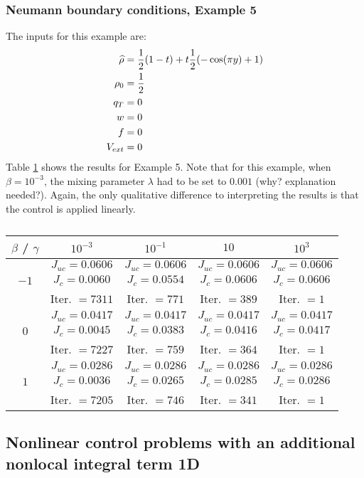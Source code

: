 \subsubsection{Neumann boundary conditions, Example 5}
The inputs for this example are:
\begin{align*}
\widehat \rho &= \frac{1}{2}(1-t) + t\frac{1}{2}(-\cos(\pi y) + 1)\\
\rho_{0} &= \frac{1}{2}\\
q_{T} &= 0\\
{w} &= 0\\
f &=0\\
V_{ext} &=0
\end{align*}
Table \ref{TabNFlowEx5} shows the results for Example 5. Note that for this example, when $\beta = 10^{-3}$, the mixing parameter $\lambda$ had to be set to $0.001$ (why? explanation needed?).
Again, the only qualitative difference to interpreting the results is that the control is applied linearly.
\begin{table}[h]
	\begin{tabular}{ ||c|| c | c |c | c ||}
		\hline
		$\beta$ / $\gamma$ & $10^{-3}$  & $10^{-1}$  & $10$ & $10^3$ \\ 
		\hline 
		& $J_{uc} = 0.0606$ & $J_{uc} = 0.0606$  & $J_{uc} = 0.0606$ & $J_{uc} = 0.0606$\\ 
		$-1$ & $J_c = 0.0060$ & $J_c = 0.0554$ & $J_c = 0.0606$ & $J_c = 0.0606$\\ 
		& Iter. $= 7311$ & Iter. $= 771$  & Iter. $= 389$ & Iter. $= 1$\\ 
		\hline
		& $J_{uc} = 0.0417$ & $J_{uc} = 0.0417$   & $J_{uc} = 0.0417$& $J_{uc} = 0.0417$\\
		$0$  & $J_c = 0.0045$ & $J_c = 0.0383$  & $J_c = 0.0416$ & $J_c = 0.0417$\\ 
		& Iter. $= 7227$ & Iter. $= 759$  & Iter. $= 364$ & Iter. $= 1$\\ 
		\hline
		& $J_{uc} = 0.0286$ & $J_{uc} = 0.0286$  & $J_{uc} = 0.0286$ & $J_{uc} = 0.0286$\\
		$1$  & $J_c = 0.0036$ & $J_c = 0.0265$  & $J_c = 0.0285$ & $J_c = 0.0286$\\ 
		& Iter. $= 7205$ & Iter. $= 746$  & Iter. $= 341$ & Iter. $= 1$\\ 
		\hline 
	\end{tabular}
	\caption{}
	\label{TabNFlowEx5}
\end{table}


\subsection{Nonlinear control problems with an additional nonlocal integral term 1D}

